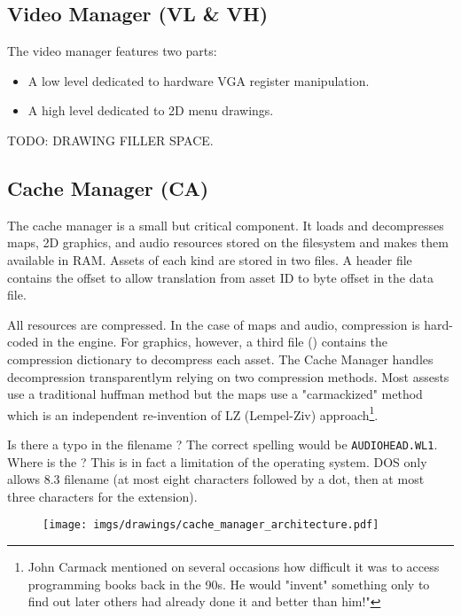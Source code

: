 \documentclass[book.tex]{subfiles}
\begin{document}
\subsection{Video Manager (VL \& VH)}
The video manager features two parts:
\begin{itemize}
\item A low level dedicated to hardware VGA register manipulation.
\item A high level dedicated to 2D menu drawings.
\end{itemize}
\par
TODO: DRAWING FILLER SPACE.





\subsection{Cache Manager (CA)}
The cache manager is a small but critical component. It loads and decompresses maps, 2D graphics, and audio resources stored on the filesystem and makes them available in RAM. Assets of each kind are stored in two files. A header file contains the offset to allow translation from asset ID to byte offset in the data file.\\
 \par
 All resources are compressed. In the case of maps and audio, compression is hard-coded in the engine. For graphics, however, a third file () contains the compression dictionary to decompress each asset. The Cache Manager handles decompression transparentlym relying on two compression methods. Most assests use a traditional huffman method but the maps use a "carmackized" method which is an independent re-invention of LZ (Lempel-Ziv) approach\footnote{John Carmack mentioned on several occasions how difficult it was to access programming books back in the 90s. He would "invent" something only to find out later others had already done it and better than him!"}.\\
\par
{} Is there a typo in the filename  ? The correct spelling would be \texttt{\justify AUDIOHEAD.WL1}. Where is the ? This is in fact a limitation of the operating system. DOS only allows 8.3 filename (at most eight characters followed by a dot, then at most three characters for the extension).
\par
\begin{figure}[H]
\centering
 \texttt{[image: imgs/drawings/cache\_manager\_architecture.pdf]}
 \end{figure}
\end{document}
